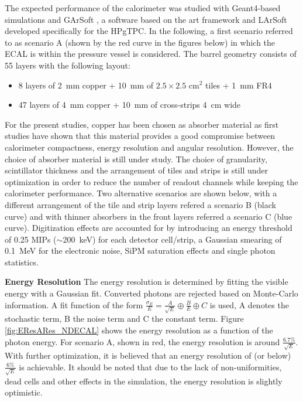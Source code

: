 The expected performance of the calorimeter was studied with Geant4-based \cite{Agostinelli:2002hh} simulations and GArSoft \cite{GArSoftwebsite}, a software based on the art framework \cite{ARTwebsite} and LArSoft \cite{Snider:2017wjd} developed specifically for the HPgTPC. In the following, a first scenario referred to as scenario A (shown by the red curve in the figures below) in which the ECAL is within the pressure vessel is considered. The barrel geometry consists of 55 layers with the following layout:
\begin{itemize}
  \item 8 layers of \SI{2}{\mm} copper + \SI{10}{\mm} of $2.5\times2.5$ cm$^2$ tiles + \SI{1}{\mm} FR4
  \item 47 layers of \SI{4}{\mm} copper + \SI{10}{\mm} of cross-strips \SI{4}{\cm} wide
\end{itemize}
For the present studies, copper has been chosen as absorber material as first studies have shown that this material provides a good compromise between calorimeter compactness, energy resolution and angular resolution. However, the choice of absorber material is still under study. The choice of granularity, scintillator thickness and the arrangement of tiles and strips is still under optimization in order to reduce the number of readout channels while keeping the calorimeter performance. Two alternative scenarios are shown below, with a different arrangement of the tile and strip layers refered a scenario B (black curve) and with thinner absorbers in the front layers referred a scenario C (blue curve).
Digitization effects are accounted for by introducing an energy threshold of 0.25 MIPs ($\sim$\SI{200}{\keV}) for each detector cell/strip, a Gaussian smearing of \SI{0.1}{\MeV} for the electronic noise, SiPM saturation effects and single photon statistics.

\textbf{Energy Resolution} The energy resolution is determined by fitting the visible energy with a Gaussian fit. Converted photons are rejected based on Monte-Carlo information. A fit function of the form $\frac{\sigma_{E}}{E} = \frac{A}{\sqrt{E}} \oplus \frac{B}{E} \oplus C$ is used, A denotes the stochastic term, B the noise term and C the constant term. Figure \ref{fig:EResARes_NDECAL} shows the energy resolution as a function of the photon energy. For scenario A, shown in red, the energy resolution is around $\frac{6.7\%}{\sqrt{E}}$. With further optimization, it is believed that an energy resolution of (or below) $\frac{6\%}{\sqrt{E}}$ is achievable. It should be noted that due to the lack of non-uniformities, dead cells and other effects in the simulation, the energy resolution is slightly optimistic.

